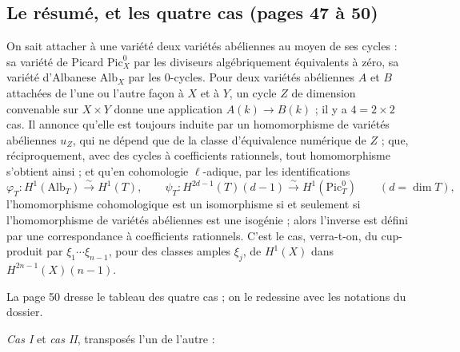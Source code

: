 \documentclass[11pt,a4paper]{article}
\begin{document}
\subsection*{Le résumé, et les quatre cas (pages 47 à 50)}

On sait attacher à une variété deux variétés abéliennes au moyen de ses
cycles : sa variété de Picard $\mathrm{Pic}^{0}_{X}$ par les diviseurs
algébriquement équivalents à zéro, sa variété d'Albanese $\mathrm{Alb}_{X}$ par
les $0$-cycles. Pour deux variétés abéliennes $A$ et $B$ attachées de l'une ou
l'autre façon à $X$ et à $Y$, un cycle $Z$ de dimension convenable sur $X \times
Y$ donne une application $A(k) \to B(k)$ ; il y a $4 = 2 \times 2$ cas. Il
annonce qu'elle est toujours induite par un homomorphisme de variétés abéliennes
$u_{Z}$, qui ne dépend que de la classe d'équivalence numérique de $Z$ ; que,
réciproquement, avec des cycles à coefficients rationnels, tout homomorphisme
s'obtient ainsi ; et qu'en cohomologie $\ell$-adique, par les identifications
\[
\varphi_{T} \colon H^{1}(\mathrm{Alb}_{T}) \xrightarrow{\ \sim\ } H^{1}(T) ,
\qquad
\psi_{T} \colon H^{2d-1}(T)(d-1) \xrightarrow{\ \sim\ }
H^{1}(\mathrm{Pic}^{0}_{T})
\qquad (d = \dim T) ,
\]
l'homomorphisme cohomologique est un isomorphisme si et seulement si
l'homomorphisme de variétés abéliennes est une isogénie ; alors l'inverse est
défini par une correspondance à coefficients rationnels. C'est le cas, verra-t-on,
du cup-produit par $\xi_{1} \cdots \xi_{n-1}$, pour des classes amples
$\xi_{j}$, de $H^{1}(X)$ dans $H^{2n-1}(X)(n-1)$.

La page 50 dresse le tableau des quatre cas ; on le redessine avec les
notations du dossier.

\emph{Cas I} et \emph{cas II}, transposés l'un de l'autre :


\end{document}
